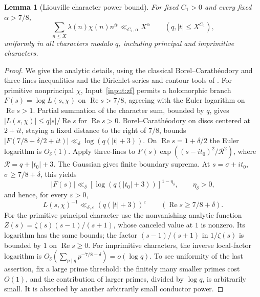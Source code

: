 \documentclass[11pt]{article}
\newtheorem{lemma}[theorem]{Lemma}
\theoremstyle{definition}
\DeclareMathOperator{\Rea}{Re}
\theoremstyle{remark}
\begin{document}
\begin{lemma}[Liouville character power bound]\label{lem:power}
For fixed $C_1>0$ and every fixed $\alpha>7/8$,
\begin{equation}\label{eq:power-bound}
\sum_{n\le X}\lambda(n)\chi(n)n^{it}\ll_{C_1,\alpha}X^\alpha
\qquad(q,|t|\le X^{C_1}),
\end{equation}
uniformly in all characters modulo $q$, including principal and
imprimitive characters.
\end{lemma}
\begin{proof}
We give the analytic details, using the classical Borel--Carath\'eodory and three-lines inequalities
and the Dirichlet-series and contour tools of \cite[Chapters~5, 10--13]{MV}.
For primitive nonprincipal $\chi$, Input~\ref{input:zf} permits a
holomorphic branch $F(s)=\log L(s,\chi)$ on $\Rea s>7/8$,
agreeing with the Euler logarithm on $\Rea s>1$.
Partial summation of the character sum, bounded by $q$, gives
$|L(s,\chi)|\le q|s|/\Rea s$ for $\Rea s>0$.
Borel--Carath\'eodory on discs centered at $2+it$, staying a fixed
distance to the right of $7/8$, bounds
$|F(7/8+\delta/2+it)|\ll_\delta\log(q(|t|+3))$.
On $\Rea s=1+\delta/2$ the Euler logarithm is $O_\delta(1)$.
Apply three-lines to
$F(s)\exp((s-it_0)^2/\mathcal R^2)$, where
$\mathcal R=q+|t_0|+3$. The Gaussian gives finite boundary suprema.
At $s=\sigma+it_0$, $\sigma\ge7/8+\delta$, this yields
\begin{equation}\label{eq:logarithm-bound}
|F(s)|\ll_\delta
[\log(q(|t_0|+3))]^{1-\eta_\delta},
\qquad \eta_\delta>0,
\end{equation}
and hence, for every $\varepsilon>0$,
\begin{equation}\label{eq:reciprocal-growth}
L(s,\chi)^{-1}\ll_{\delta,\varepsilon}
(q(|t|+3))^\varepsilon\qquad(\Rea s\ge7/8+\delta).
\end{equation}
For the primitive principal character use the nonvanishing analytic
function $Z(s)=\zeta(s)(s-1)/(s+1)$, whose canceled value at $1$ is
nonzero. Its logarithm has the same bounds; the factor
$(s-1)/(s+1)$ in $1/\zeta(s)$ is bounded by $1$ on $\Rea s\ge0$.
For imprimitive characters, the inverse local-factor logarithm is
$O_\delta(\sum_{p\mid q}p^{-7/8-\delta})=o(\log q)$.
To see uniformity of the last assertion, fix a large prime threshold:
the finitely many smaller primes cost $O(1)$, and the contribution of
larger primes, divided by $\log q$, is arbitrarily small.
It is absorbed by another arbitrarily small conductor power.


\end{proof}
\end{document}
